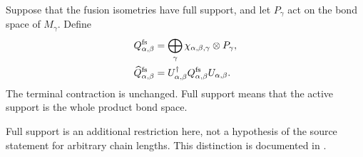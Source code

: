 \begin{definition}%
    \label{def:mpdo_full_support_virtual_projector_one_fusion}
    \leanok
    Suppose that the fusion isometries have full support, and let $P_\gamma$
    act on the bond space of $M_\gamma$. Define
    \begin{align}
        Q^{\mathrm{fs}}_{\alpha,\beta}
         & =\bigoplus_\gamma
        \chi_{\alpha,\beta,\gamma}\otimes P_\gamma,
        \notag                         \\
        \widehat Q^{\mathrm{fs}}_{\alpha,\beta}
         & =U_{\alpha,\beta}^{\dagger}
        Q^{\mathrm{fs}}_{\alpha,\beta}U_{\alpha,\beta}.
        \notag
    \end{align}
    The terminal contraction is unchanged. Full support means that the
    active support is the whole product bond space.

    Full support is an additional restriction here, not a hypothesis of the
    source statement for arbitrary chain lengths. This distinction is
    documented in
    \cite{gap:cpsv16_topological_projector_recursion}.
\end{definition}


